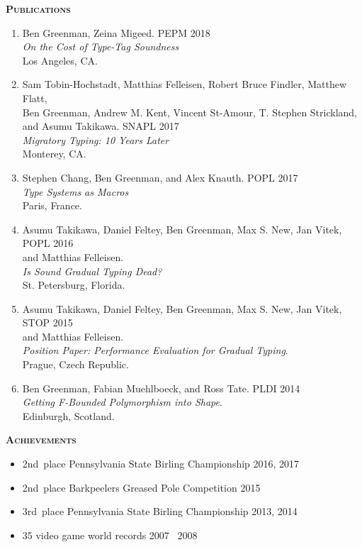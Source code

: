 \documentclass{article}
\newcommand{\mysection}[1]{\vspace{0.5cm}
\hspace{-1.3cm}\textsc{\textbf{#1}}~\hrulefill}
\begin{document}
\mysection{Publications}
\begin{enumerate}
\item
  Ben Greenman, Zeina Migeed. \hfill PEPM 2018 \\
  \emph{On the Cost of Type-Tag Soundness} \\
  Los Angeles, CA.
\item
  Sam Tobin-Hochstadt, Matthias Felleisen, Robert Bruce Findler, Matthew Flatt, \\
  Ben Greenman, Andrew M. Kent, Vincent St-Amour, T. Stephen Strickland, \\
  and Asumu Takikawa. \hfill SNAPL 2017 \\
  \emph{Migratory Typing: 10 Years Later} \\
  Monterey, CA.
\item
  Stephen Chang, Ben Greenman, and Alex Knauth. \hfill POPL 2017 \\
   \emph{Type Systems as Macros} \\
  Paris, France.
\item
  Asumu Takikawa, Daniel Feltey, Ben Greenman, Max S. New, Jan Vitek, \hfill POPL 2016 \\
   and Matthias Felleisen. \\
   \emph{Is Sound Gradual Typing Dead?} \\
  St. Petersburg, Florida.
\item
  Asumu Takikawa, Daniel Feltey, Ben Greenman, Max S. New, Jan Vitek, \hfill STOP 2015 \\
   and Matthias Felleisen. \\
   \emph{Position Paper: Performance Evaluation for Gradual Typing}. \\
  Prague, Czech Republic.
\item
  Ben Greenman, Fabian Muehlboeck, and Ross Tate. \hfill PLDI 2014 \\
  \emph{Getting F-Bounded Polymorphism into Shape}. \\
  Edinburgh, Scotland.
\end{enumerate}


\mysection{Achievements}

\begin{itemize}
\item 2nd~place Pennsylvania State Birling Championship \hfill 2016, 2017
\item 2nd~place Barkpeelers Greased Pole Competition \hfill 2015
\item 3rd~place Pennsylvania State Birling Championship \hfill 2013, 2014
\item 35 video game world records \hfill 2007 \textendash\ 2008
\end{itemize}
\end{document}
